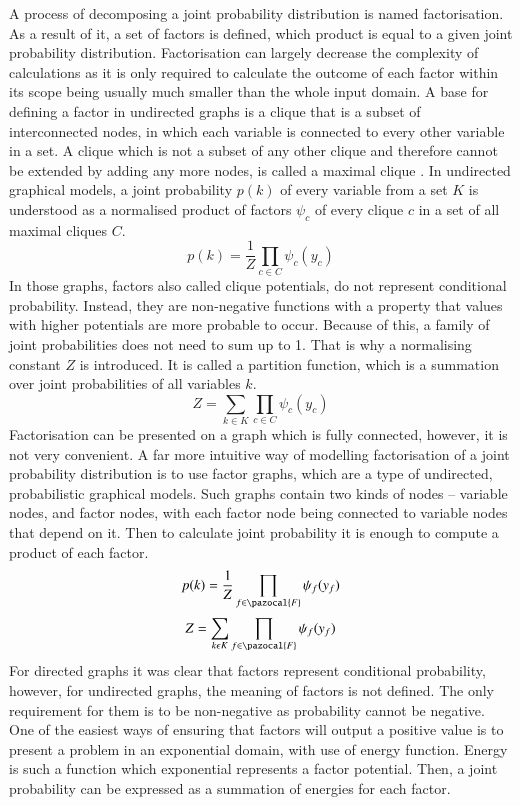A process of decomposing a joint probability distribution is named factorisation. As a result of it, a set of factors is defined, which product is equal to a given joint probability distribution. Factorisation can largely decrease the complexity of calculations as it is only required to calculate the outcome of each factor within its scope being usually much smaller than the whole input domain. A base for defining a factor in undirected graphs is a clique that is a subset of interconnected nodes, in which each variable is connected to every other variable in a set. A clique which is not a subset of any other clique and therefore cannot be extended by adding any more nodes, is called a maximal clique \cite{clique}. In undirected graphical models, a joint probability $p(k)$ of every variable from a set $K$ is understood as a normalised product of factors $\psi_{c}$ of every clique $c$ in a set of all maximal cliques $C$. 
\begin{equation}
    p(k)=\frac{1}{Z}\prod_{c\in C}\psi_{c}({y_c})
\end{equation}
In those graphs, factors also called clique potentials, do not represent conditional probability. Instead, they are non-negative functions with a property that values with higher potentials are more probable to occur. Because of this, a family of joint probabilities does not need to sum up to 1. That is why a normalising constant $Z$ is introduced. It is called a partition function, which is a summation over joint probabilities of all variables $k$.
\begin{equation}
    Z=\sum_{k\in K}\prod_{c\in C}\psi_{c}({y_c}) 
\end{equation}
Factorisation can be presented on a graph which is fully connected, however, it is not very convenient. A far more intuitive way of modelling factorisation of a joint probability distribution is to use factor graphs, which are a type of undirected, probabilistic graphical models. Such graphs contain two kinds of nodes – variable nodes, and factor nodes, with each factor node being connected to variable nodes that depend on it. Then to calculate joint probability it is enough to compute a product of each factor.
\begin{equation}
    p(k)=\frac{1}{Z}\prod_{f\in \pazocal{F}}\psi_{f}({y_f})
\end{equation}
\begin{equation}
     Z=\sum_{k\epsilon K}\prod_{f\in \pazocal{F}}\psi_{f}({y_f})
\end{equation}
For directed graphs it was clear that factors represent conditional probability, however, for undirected graphs, the meaning of factors is not defined. The only requirement for them is to be non-negative as probability cannot be negative. One of the easiest ways of ensuring that factors will output a positive value is to present a problem in an exponential domain, with use of energy function. Energy is such a function which exponential represents a factor potential. Then, a joint probability can be expressed as a summation of energies for each factor. 
